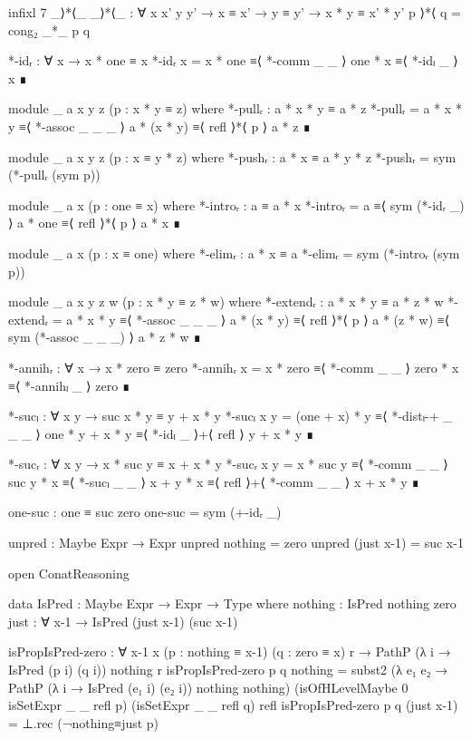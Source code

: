 \begin{code}[hide]
    infixl 7 _⟩*⟨_
    _⟩*⟨_ : ∀ {x x' y y'} → x ≡ x' → y ≡ y' → x * y ≡ x' * y'
    p ⟩*⟨ q = cong₂ _*_ p q

    *-idᵣ : ∀ x → x * one ≡ x
    *-idᵣ x =
      x * one ≡⟨ *-comm _ _ ⟩
      one * x ≡⟨ *-idₗ _ ⟩
      x       ∎

    module _ {a x y z} (p : x * y ≡ z) where
      *-pullᵣ : a * x * y ≡ a * z
      *-pullᵣ =
        a * x * y   ≡⟨ *-assoc _ _ _ ⟩
        a * (x * y) ≡⟨ refl ⟩*⟨ p ⟩
        a * z       ∎

    module _ {a x y z} (p : x ≡ y * z) where
      *-pushᵣ : a * x ≡ a * y * z
      *-pushᵣ = sym (*-pullᵣ (sym p))

    module _ {a x} (p : one ≡ x) where
      *-introᵣ : a ≡ a * x
      *-introᵣ =
        a       ≡⟨ sym (*-idᵣ _) ⟩
        a * one ≡⟨ refl ⟩*⟨ p ⟩
        a * x   ∎

    module _ {a x} (p : x ≡ one) where
      *-elimᵣ : a * x ≡ a
      *-elimᵣ = sym (*-introᵣ (sym p))

    module _ {a x y z w} (p : x * y ≡ z * w) where
      *-extendᵣ : a * x * y ≡ a * z * w
      *-extendᵣ =
        a * x * y   ≡⟨ *-assoc _ _ _ ⟩
        a * (x * y) ≡⟨ refl ⟩*⟨ p ⟩
        a * (z * w) ≡⟨ sym (*-assoc _ _ _) ⟩
        a * z * w   ∎

    *-annihᵣ : ∀ x → x * zero ≡ zero
    *-annihᵣ x =
      x * zero ≡⟨ *-comm _ _ ⟩
      zero * x ≡⟨ *-annihₗ _ ⟩
      zero     ∎

    *-sucₗ : ∀ x y → suc x * y ≡ y + x * y
    *-sucₗ x y =
      (one + x) * y   ≡⟨ *-distₗ-+ _ _ _ ⟩
      one * y + x * y ≡⟨ *-idₗ _ ⟩+⟨ refl ⟩
      y + x * y       ∎

    *-sucᵣ : ∀ x y → x * suc y ≡ x + x * y
    *-sucᵣ x y =
      x * suc y ≡⟨ *-comm _ _ ⟩
      suc y * x ≡⟨ *-sucₗ _ _ ⟩
      x + y * x ≡⟨ refl ⟩+⟨ *-comm _ _ ⟩
      x + x * y ∎

    one-suc : one ≡ suc zero
    one-suc = sym (+-idᵣ _)

    unpred : Maybe Expr → Expr
    unpred nothing = zero
    unpred (just x-1) = suc x-1

  open ConatReasoning

  data IsPred : Maybe Expr → Expr → Type where
    nothing : IsPred nothing zero
    just : ∀ x-1 → IsPred (just x-1) (suc x-1)

  isPropIsPred-zero :
    ∀ {x-1 x} (p : nothing ≡ x-1) (q : zero ≡ x) r →
    PathP (λ i → IsPred (p i) (q i)) nothing r
  isPropIsPred-zero p q nothing =
    subst2 (λ e₁ e₂ → PathP (λ i → IsPred (e₁ i) (e₂ i)) nothing nothing)
      (isOfHLevelMaybe 0 isSetExpr _ _ refl p)
      (isSetExpr _ _ refl q)
      refl
  isPropIsPred-zero p q (just x-1) = ⊥.rec (¬nothing≡just p)


\end{code}
